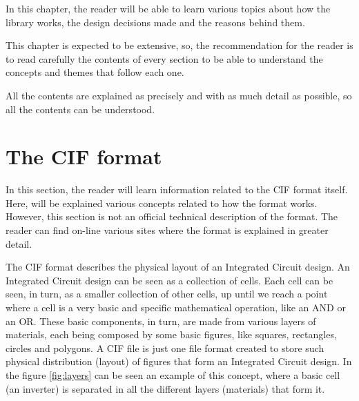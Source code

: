 \documentclass[11pt,twoside,openany,x11names,svgnames]{memoir}
\begin{document}
In this chapter, the reader will be able to learn various topics about how the library works, the design decisions made and the reasons behind them.

This chapter is expected to be extensive, so, the recommendation for the reader is to read carefully the contents of every section to be able to understand the concepts and themes that follow each one.

All the contents are explained as precisely and with as much detail as possible, so all the contents can be understood.
\newpage 

\section{The CIF format}\label{The-CIF-format}

In this section, the reader will learn information related to the CIF format itself. Here, will be explained various concepts related to how the format works. However, this section is not an official technical description of the format. The reader can find on-line various sites where the format is explained in greater detail.

The CIF format describes the physical layout of an Integrated Circuit design. An Integrated Circuit design can be seen as a collection of cells. Each cell can be seen, in turn, as a smaller collection of other cells, up until we reach a point where a cell is a very basic and specific mathematical operation, like an AND or an OR. These basic components, in turn, are made from various layers of materials, each being composed by some basic figures, like squares, rectangles, circles and polygons. A CIF file is just one file format created to store such physical distribution (layout) of figures that form an Integrated Circuit design. In the figure \ref{fig:layers} can be seen an example of this concept, where a basic cell (an inverter) is separated in all the different layers (materials) that form it.
\end{document}
